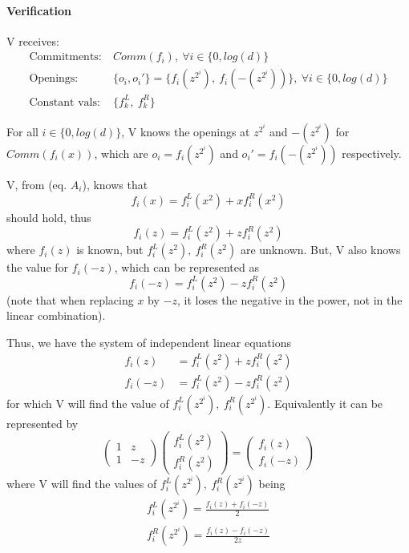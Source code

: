 \documentclass{article}
\theoremstyle{definition}
\begin{document}
\paragraph{Verification}

V receives:
\begin{align*}
	\text{Commitments:}~ &Comm(f_i),~ \forall i \in \{0, log(d)\}\\
	\text{Openings:}~ &\{o_i, o_i'\}=\{ f_i(z^{2^i}),~f_i(-(z^{2^i})) \},~ \forall i \in \{0, log(d)\}\\
	\text{Constant vals:}~ &\{f_k^L,~f_k^R\}
\end{align*}

\vspace{20px}

For all $i \in \{0, log(d)\}$, V knows the openings at $z^{2^i}$ and $-(z^{2^i})$ for\\
$Comm(f_i(x))$, which are $o_i=f_i(z^{2^i})$ and $o_i'=f_i(-(z^{2^i}))$ respectively.

V, from (eq. $A_i$), knows that
$$f_i(x)=f_i^L(x^2) + x f_i^R(x^2)$$
should hold, thus
$$f_i(z)=f_i^L(z^2) + z f_i^R(z^2)$$
where $f_i(z)$ is known, but $f_i^L(z^2),~f_i^R(z^2)$ are unknown.
But, V also knows the value for $f_i(-z)$, which can be represented as
$$f_i(-z)=f_i^L(z^2) - z f_i^R(z^2)$$
(note that when replacing $x$ by $-z$, it loses the negative in the power, not in the linear combination).

Thus, we have the system of independent linear equations
\begin{align*} %
	f_i(z)&=f_i^L(z^2) + z f_i^R(z^2)\\
	f_i(-z)&=f_i^L(z^2) - z f_i^R(z^2)
\end{align*}
for which V will find the value of $f_i^L(z^{2^i}),~f_i^R(z^{2^i})$.
Equivalently it can be represented by
$$
\begin{pmatrix}
	1 & z\\
	1 & -z
\end{pmatrix}
\begin{pmatrix}
	f_i^L(z^2)\\
	f_i^R(z^2)
\end{pmatrix}
=
\begin{pmatrix}
	f_i(z)\\
	f_i(-z)
\end{pmatrix}
$$
where V will find the values of $f_i^L(z^{2^i}),~f_i^R(z^{2^i})$ being
\begin{align*}
	f_i^L(z^{2^i})=\frac{f_i(z) + f_i(-z)}{2}\\
	f_i^R(z^{2^i})=\frac{f_i(z) - f_i(-z)}{2z}\\
\end{align*}
\end{document}
